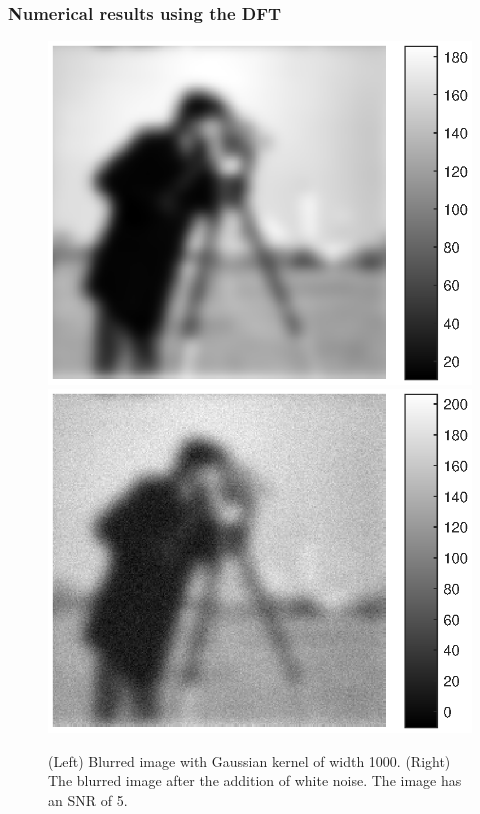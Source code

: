 \documentclass[t]{beamer}
\begin{document}
\begin{frame}
\frametitle{Numerical results using the DFT}
\begin{figure}
\centering
\includegraphics[scale=0.45]{Figures/CameramanBlurred.eps}
\includegraphics[scale=0.45]{Figures/CameramanBlurredNoisy.eps}
\caption{(Left) Blurred image with Gaussian kernel of width 1000. (Right) The blurred image after the addition of white noise. The image has an SNR of 5.}
\end{figure}
\end{frame}
\end{document}
